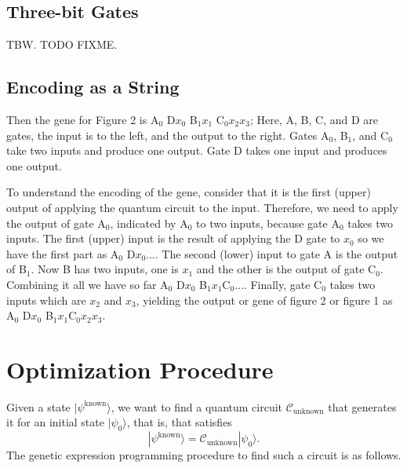 \documentclass{article}
\begin{document}
\subsection{Three-bit Gates}
TBW. TODO FIXME.

\subsection{Encoding as a String}
Then the gene for Figure 2 is A$_0$ D$x_0$  B$_1x_1$ C$_0x_2x_3$;
Here, A, B, C, and D are gates, the input is to the left, and the output to the right.
Gates A$_0$, B$_1$, and C$_0$ take two inputs and produce one output. Gate D takes one input and produces one output.

To understand the encoding of the gene, consider that it is the first (upper) output of applying
the quantum circuit to the input. Therefore, we need
to apply the output of gate A$_0$, indicated by A$_0$ to two inputs, because
gate A$_0$ takes two inputs. The first (upper) input is the result of applying the D gate
to $x_0$ so we have the first part as A$_0$ D$x_0\ldots$. The second (lower) input to gate
A is the output of B$_1$. Now B has two inputs, one is $x_1$ and the other is
the output of gate C$_0$. Combining it all we have so far
A$_0$ D$x_0$ B$_1x_1$C$_0\ldots$. Finally, gate C$_0$ takes two inputs which are $x_2$ and $x_3$,
yielding the output or gene of figure 2 or figure 1 as A$_0$ D$x_0$ B$_1x_1$C$_0x_2x_3$.

\section{Optimization Procedure}
Given a state $|\psi^{\textrm{known}}\rangle$, we want to find a quantum
circuit $\mathcal{C}_{\textrm{unknown}}$ that generates it for an initial state $|\psi_0\rangle$,
that is, that satisfies 
\begin{equation}
	|\psi^{\textrm{known}}\rangle=\mathcal{C}_{\textrm{unknown}}|\psi_0\rangle.
\end{equation}
The genetic expression programming procedure to find such a circuit is as follows.
\end{document}
